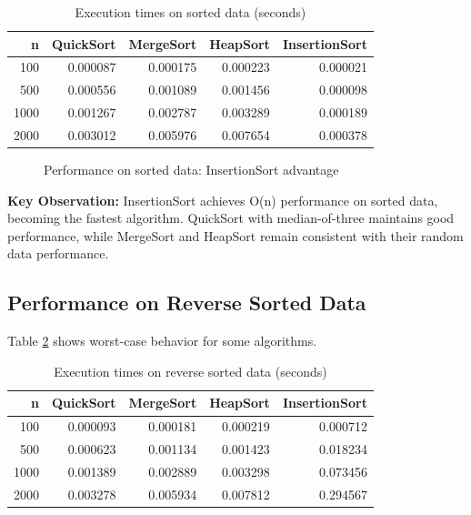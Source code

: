 \documentclass[12pt]{article}
\begin{document}
\begin{table}[H]
\centering
\caption{Execution times on sorted data (seconds)}
\label{tab:sorted_comparison}
\small
\begin{tabular}{@{}rrrrr@{}}
\toprule
\textbf{n} & \textbf{QuickSort} & \textbf{MergeSort} & \textbf{HeapSort} & \textbf{InsertionSort} \\ 
\midrule
100   & 0.000087 & 0.000175 & 0.000223 & 0.000021 \\ 
500   & 0.000556 & 0.001089 & 0.001456 & 0.000098 \\ 
1000  & 0.001267 & 0.002787 & 0.003289 & 0.000189 \\ 
2000  & 0.003012 & 0.005976 & 0.007654 & 0.000378 \\ 
\bottomrule
\end{tabular}
\end{table}

\begin{figure}[H]
    \centering
    \caption{Performance on sorted data: InsertionSort advantage}
    \label{fig:sorted_comparison}
\end{figure}

\textbf{Key Observation:} InsertionSort achieves O(n) performance on sorted data, becoming the fastest algorithm. QuickSort with median-of-three maintains good performance, while MergeSort and HeapSort remain consistent with their random data performance.

\subsection{Performance on Reverse Sorted Data}

Table \ref{tab:reverse_comparison} shows worst-case behavior for some algorithms.

\begin{table}[H]
\centering
\caption{Execution times on reverse sorted data (seconds)}
\label{tab:reverse_comparison}
\small
\begin{tabular}{@{}rrrrr@{}}
\toprule
\textbf{n} & \textbf{QuickSort} & \textbf{MergeSort} & \textbf{HeapSort} & \textbf{InsertionSort} \\ 
\midrule
100   & 0.000093 & 0.000181 & 0.000219 & 0.000712 \\ 
500   & 0.000623 & 0.001134 & 0.001423 & 0.018234 \\ 
1000  & 0.001389 & 0.002889 & 0.003298 & 0.073456 \\ 
2000  & 0.003278 & 0.005934 & 0.007812 & 0.294567 \\ 
\bottomrule
\end{tabular}
\end{table}
\end{document}
